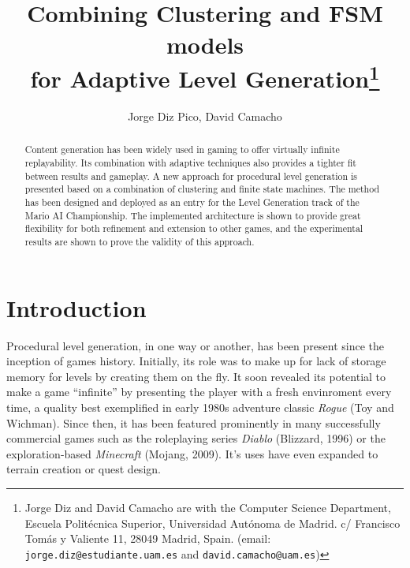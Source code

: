 \documentclass[conference]{IEEEtran}
\begin{document}
\title{\ \\ \LARGE\bf Combining Clustering and FSM models \\ for Adaptive Level Generation\thanks{Jorge Diz and David Camacho are with the Computer Science Department, Escuela Politécnica Superior, Universidad Autónoma de Madrid. c/ Francisco Tomás y Valiente 11, 28049 Madrid, Spain. (email: {\tt jorge.diz@estudiante.uam.es} and {\tt david.camacho@uam.es})}}

\author{Jorge Diz Pico, David Camacho}


\maketitle

\begin{abstract}
Content generation has been widely used in gaming
to offer virtually infinite replayability.
Its combination with adaptive techniques also provides a tighter fit between
results and gameplay.
A new approach for procedural level generation
is presented based on a combination of clustering and finite state machines.
The method has been designed and deployed as an entry for the 
Level Generation track of the Mario AI Championship.
The implemented architecture is shown to provide
great flexibility for both refinement and
extension to other games, and the
experimental results are shown to prove
the validity of this approach. 

\end{abstract}


\section{Introduction}
Procedural level generation, in one way or another, has been present since the inception of games history. Initially, its role was to make up for lack of storage memory for levels by creating them on the fly. It soon revealed its potential to make a game ``infinite'' by presenting the player with a fresh envinroment every time, a quality best exemplified in early 1980s adventure classic \textit{Rogue} (Toy and Wichman). Since then, it has been featured prominently in many successfully commercial games such as the roleplaying series \textit{Diablo} (Blizzard, 1996) or the exploration-based \textit{Minecraft} (Mojang, 2009). It's uses have even expanded to terrain creation \cite{rodenparberry2004} or \cite{mmorpg06} quest design.
\end{document}
